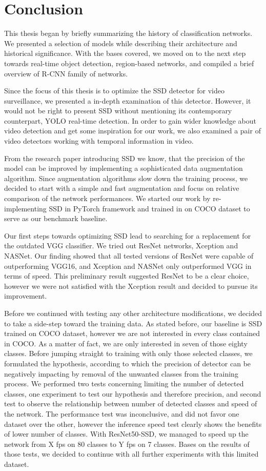 \chapter*{Conclusion}
This thesis began by briefly summarizing the history of classification networks. We presented a selection of models while describing their architecture and historical significance. With the bases covered, we moved on to the next step towards real-time object detection, region-based networks, and compiled a brief overview of R-CNN family of networks.

Since the focus of this thesis is to optimize the SSD detector for video surveillance, we presented a in-depth examination of this detector. However, it would not be right to present SSD without mentioning its contemporary counterpart, YOLO real-time detection. In order to gain wider knowledge about video detection and get some inspiration for our work, we also examined a pair of video detectors working with temporal information in video.

From the research paper introducing SSD we know, that the precision of the model can be improved by implementing a sophisticated data augmentation algorithm. Since augmentation algorithms slow down the training process, we decided to start with a simple and fast augmentation and focus on relative comparison of the network performances. We started our work by re-implementing SSD in PyTorch framework and trained in on COCO dataset to serve as our benchmark baseline. 

Our first steps towards optimizing SSD lead to searching for a replacement for the outdated VGG classifier. We tried out ResNet networks, Xception and NASNet. Our finding showed that all tested versions of ResNet were capable of outperforming VGG16, and Xception and NASNet only outperformed VGG in terms of speed. This preliminary result suggested ResNet to be a clear choice, however we were not satisfied with the Xception result and decided to pursue its improvement. 

Before we continued with testing any other architecture modifications, we decided to take a side-step toward the training data. As stated before, our baseline is SSD trained on COCO dataset, however we are not interested in every class contained in COCO. As a matter of fact, we are only interested in seven of those eighty classes. Before jumping straight to training with only those selected classes, we formulated the hypothesis, according to which the precision of detector can be negatively impacting by removal of the unwanted classes from the training process. We performed two tests concerning limiting the number of detected classes, one experiment to test our hypothesis and therefore precision, and second test to observe the relationship between number of detected classes and speed of the network. The performance test was inconclusive, and did not favor one dataset over the other, however the inference speed test clearly shows the benefits of lower number of classes. With ResNet50-SSD, we managed to speed up the network from X fps on 80 classes to Y fps on 7 classes. Bases on the results of those tests, we decided to continue with all further experiments with this limited dataset.

